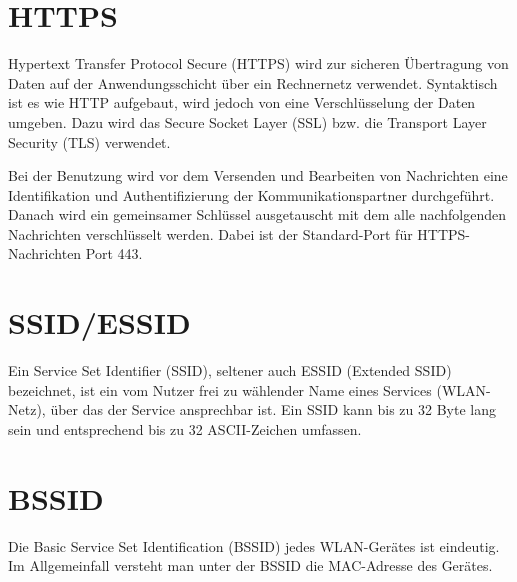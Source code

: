 \section{HTTPS}
Hypertext Transfer Protocol Secure (HTTPS) wird zur sicheren Übertragung von Daten auf der Anwendungsschicht über ein Rechnernetz verwendet. Syntaktisch ist es wie HTTP aufgebaut, wird jedoch von eine Verschlüsselung der Daten umgeben. Dazu wird das Secure Socket Layer (SSL) bzw. die Transport Layer Security (TLS) verwendet.

Bei der Benutzung wird vor dem Versenden und Bearbeiten von Nachrichten eine Identifikation und Authentifizierung der Kommunikationspartner durchgeführt. Danach wird ein gemeinsamer Schlüssel ausgetauscht mit dem alle nachfolgenden Nachrichten verschlüsselt werden. Dabei ist der Standard-Port für HTTPS-Nachrichten Port 443.

\section{SSID/ESSID}
Ein Service Set Identifier (SSID), seltener auch ESSID (Extended SSID) bezeichnet, ist ein vom Nutzer frei zu wählender Name eines Services (WLAN-Netz), über das der Service ansprechbar ist. Ein SSID kann bis zu 32 Byte lang sein und entsprechend bis zu 32 ASCII-Zeichen umfassen.
\section{BSSID}
Die Basic Service Set Identification (BSSID) jedes WLAN-Gerätes ist eindeutig. Im Allgemeinfall versteht man unter der BSSID die MAC-Adresse des Gerätes. 
